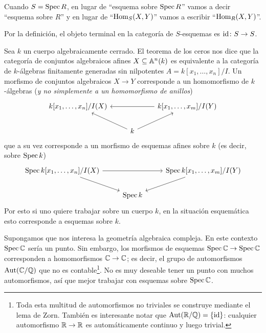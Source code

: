 \documentclass{article}
\numberwithin{equation}{section}
\theoremstyle{definition}
\begin{document}
\begin{comentario}
  Cuando $S = \Spec R$, en lugar de ``esquema sobre $\Spec R$'' vamos a decir
  ``esquema sobre $R$'' y en lugar de ``$\Hom_S (X,Y)$'' vamos a escribir
  ``$\Hom_R (X,Y)$''.
\end{comentario}

Por la definición, el objeto terminal en la categoría de $S$-esquemas es
$\idid\colon S\to S$.

\begin{ejemplo}
  Sea $k$ un cuerpo algebraicamente cerrado. El teorema de los ceros nos dice
  que la categoría de conjuntos algebraicos afines ${X \subseteq \AA^n (k)}$ es
  equivalente a la categoría de $k$-álgebras finitamente generadas sin
  nilpotentes $A = k[x_1,\ldots,x_n]/I$. Un morfismo de conjuntos algebraicos
  $X \to Y$ corresponde a un homomorfismo de $k$-álgebras
  (\emph{y no simplemente a un homomorfismo de anillos})
  \[ \begin{tikzcd}
      k [x_1,\ldots,x_n] / I (X) && k [x_1,\ldots,x_m] / I (Y) \ar{ll} \\
      & k \ar{ul}\ar{ur}
    \end{tikzcd} \]
  que a su vez corresponde a un morfismo de esquemas afines sobre $k$ (es decir,
  sobre $\Spec k$)
  \[ \begin{tikzcd}
      \Spec k [x_1,\ldots,x_n] / I (X)\ar{rr}\ar{dr} && \Spec k [x_1,\ldots,x_m] / I (Y)\ar{dl} \\
      & \Spec k
    \end{tikzcd} \]
  Por esto si uno quiere trabajar sobre un cuerpo $k$, en la situación
  esquemática esto corresponde a esquemas sobre $k$.
\end{ejemplo}

\begin{ejemplo}
  Supongamos que nos interesa la geometría algebraica compleja. En este contexto
  $\Spec \CC$ sería un punto. Sin embargo, los morfismos de esquemas
  $\Spec \CC \to \Spec \CC$ corresponden a homomorfismos $\CC \to \CC$;
  es decir, el grupo de automorfismos $\Aut (\CC/\QQ)$ que no es
  contable\footnote{Toda esta multitud de automorfismos no triviales se
    construye mediante el lema de Zorn. También es interesante notar que
    $\Aut (\RR/\QQ) = \{ \idid \}$: cualquier automorfismo $\RR \to \RR$ es
    automáticamente continuo y luego trivial.}. No es muy deseable tener
  un punto con muchos automorfismos, así que mejor trabajar con esquemas sobre
  $\Spec \CC$.
\end{ejemplo}
\end{document}
